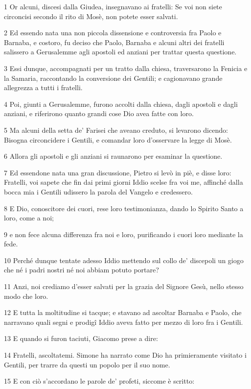 \par 1 Or alcuni, discesi dalla Giudea, insegnavano ai fratelli: Se voi non siete circoncisi secondo il rito di Mosè, non potete esser salvati.
\par 2 Ed essendo nata una non piccola dissensione e controversia fra Paolo e Barnaba, e costoro, fu deciso che Paolo, Barnaba e alcuni altri dei fratelli salissero a Gerusalemme agli apostoli ed anziani per trattar questa questione.
\par 3 Essi dunque, accompagnati per un tratto dalla chiesa, traversarono la Fenicia e la Samaria, raccontando la conversione dei Gentili; e cagionavano grande allegrezza a tutti i fratelli.
\par 4 Poi, giunti a Gerusalemme, furono accolti dalla chiesa, dagli apostoli e dagli anziani, e riferirono quanto grandi cose Dio avea fatte con loro.
\par 5 Ma alcuni della setta de' Farisei che aveano creduto, si levarono dicendo: Bisogna circoncidere i Gentili, e comandar loro d'osservare la legge di Mosè.
\par 6 Allora gli apostoli e gli anziani si raunarono per esaminar la questione.
\par 7 Ed essendone nata una gran discussione, Pietro si levò in piè, e disse loro: Fratelli, voi sapete che fin dai primi giorni Iddio scelse fra voi me, affinché dalla bocca mia i Gentili udissero la parola del Vangelo e credessero.
\par 8 E Dio, conoscitore dei cuori, rese loro testimonianza, dando lo Spirito Santo a loro, come a noi;
\par 9 e non fece alcuna differenza fra noi e loro, purificando i cuori loro mediante la fede.
\par 10 Perché dunque tentate adesso Iddio mettendo sul collo de' discepoli un giogo che né i padri nostri né noi abbiam potuto portare?
\par 11 Anzi, noi crediamo d'esser salvati per la grazia del Signore Gesù, nello stesso modo che loro.
\par 12 E tutta la moltitudine si tacque; e stavano ad ascoltar Barnaba e Paolo, che narravano quali segni e prodigî Iddio aveva fatto per mezzo di loro fra i Gentili.
\par 13 E quando si furon taciuti, Giacomo prese a dire:
\par 14 Fratelli, ascoltatemi. Simone ha narrato come Dio ha primieramente visitato i Gentili, per trarre da questi un popolo per il suo nome.
\par 15 E con ciò s'accordano le parole de' profeti, siccome è scritto:
